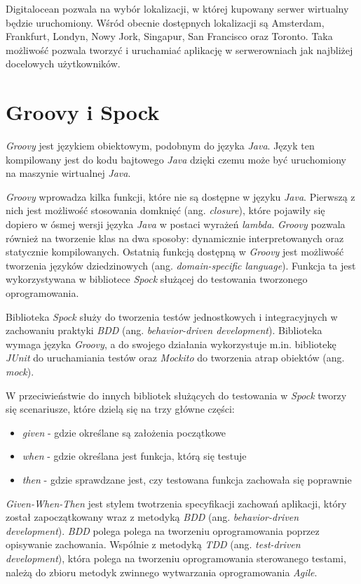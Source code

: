 Digitalocean pozwala na wybór lokalizacji, w której kupowany serwer wirtualny będzie uruchomiony. Wśród obecnie dostępnych lokalizacji są Amsterdam, Frankfurt, Londyn, Nowy Jork, Singapur, San Francisco oraz Toronto. Taka możliwość pozwala tworzyć i uruchamiać aplikację w serwerowniach jak najbliżej docelowych użytkowników. 

\section{Groovy i Spock}

\textsl{Groovy} jest językiem obiektowym, podobnym do języka \textsl{Java}. Język ten kompilowany jest do kodu bajtowego \textsl{Java} dzięki czemu może być uruchomiony na maszynie wirtualnej \textsl{Java}. 

\textsl{Groovy} wprowadza kilka funkcji, które nie są dostępne w języku \textsl{Java}. Pierwszą z nich jest możliwość stosowania domknięć (ang. \textsl{closure}), które pojawiły się dopiero w ósmej wersji języka \textsl{Java} w postaci wyrażeń \textsl{lambda}. \textsl{Groovy} pozwala również na tworzenie klas na dwa sposoby: dynamicznie interpretowanych oraz statycznie kompilowanych. Ostatnią funkcją dostępną w \textsl{Groovy} jest możliwość tworzenia języków dziedzinowych (ang. \textsl{domain-specific language}). Funkcja ta jest wykorzystywana w bibliotece \textsl{Spock} służącej do testowania tworzonego oprogramowania.

Biblioteka \textsl{Spock} służy do tworzenia testów jednostkowych i integracyjnych w zachowaniu praktyki \textsl{BDD} (ang. \textsl{behavior-driven development}). Biblioteka wymaga języka \textsl{Groovy}, a do swojego działania wykorzystuje m.in. bibliotekę \textsl{JUnit} do uruchamiania testów oraz \textsl{Mockito} do tworzenia atrap obiektów (ang. \textsl{mock}). 

W przeciwieństwie do innych bibliotek służących do testowania w \textsl{Spock} tworzy się scenariusze, które dzielą się na trzy główne części: 
\begin{itemize}
    \item \textsl{given} - gdzie określane są założenia początkowe
    \item \textsl{when} - gdzie określana jest funkcja, którą się testuje
    \item \textsl{then} - gdzie sprawdzane jest, czy testowana funkcja zachowała się poprawnie
\end{itemize}
\textsl{Given-When-Then} jest stylem twotrzenia specyfikacji zachowań aplikacji, który został zapoczątkowany wraz z metodyką \textsl{BDD} (ang. \textsl{behavior-driven development}). \textsl{BDD} polega polega na tworzeniu oprogramowania poprzez opisywanie zachowania. Wspólnie z metodyką \textsl{TDD} (ang. \textsl{test-driven development}), która polega na tworzeniu oprogramowania sterowanego testami, należą do zbioru metodyk zwinnego wytwarzania oprogramowania \textsl{Agile}.